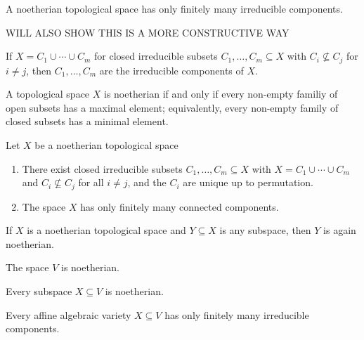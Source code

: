 \begin{lemma}
  A noetherian topological space has only finitely many irreducible components.
\end{lemma}


\begin{fluff}
  WILL ALSO SHOW THIS IS A MORE CONSTRUCTIVE WAY
\end{fluff}


\begin{lemma}
  If $X = C_1 \cup \dotsb \cup C_m$ for closed irreducible subsets $C_1, \dotsc, C_m \subseteq X$ with $C_i \nsubseteq C_j$ for $i \neq j$, then $C_1, \dotsc, C_m$ are the irreducible components of $X$.
\end{lemma}


\begin{lemma}
  A topological space $X$ is noetherian if and only if every non-empty familiy of open subsets has a maximal element;
  equivalently, every non-empty family of closed subsets has a minimal element.
\end{lemma}


\begin{proposition}
  Let $X$ be a noetherian topological space
  \begin{enumerate}
    \item
      There exist closed irreducible subsets $C_1, \dotsc, C_m \subseteq X$ with $X = C_1 \cup \dotsb \cup C_m$ and $C_i \nsubseteq C_j$ for all $i \neq j$, and the $C_i$ are unique up to permutation.
    \item
      The space $X$ has only finitely many connected components.
  \end{enumerate}
\end{proposition}


\begin{lemma}
  If $X$ is a noetherian topological space and $Y \subseteq X$ is any subspace, then $Y$ is again noetherian.
\end{lemma}


\begin{lemma}
  The space $V$ is noetherian.
\end{lemma}


\begin{corollary}
  Every subspace $X \subseteq V$ is noetherian.
\end{corollary}


\begin{corollary}
  Every affine algebraic variety $X \subseteq V$ has only finitely many irreducible components.
\end{corollary}











